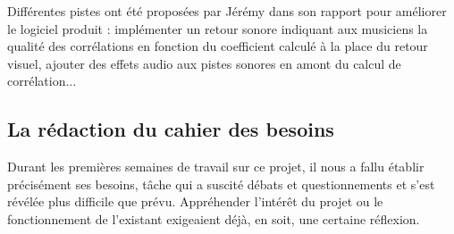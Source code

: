 Différentes pistes ont été proposées par Jérémy dans son rapport pour
améliorer le logiciel produit : implémenter un retour sonore indiquant
aux musiciens la qualité des corrélations en fonction du coefficient
calculé à la place du retour visuel, ajouter des effets audio aux
pistes sonores en amont du calcul de corrélation...

\subsection{La rédaction du cahier des besoins}

Durant les premières semaines de travail sur ce projet, il nous a
fallu établir précisément ses besoins, tâche qui a suscité débats et
questionnements et s'est révélée plus difficile que prévu. Appréhender
l'intérêt du projet ou le fonctionnement de l'existant exigeaient
déjà, en soit, une certaine réflexion.

